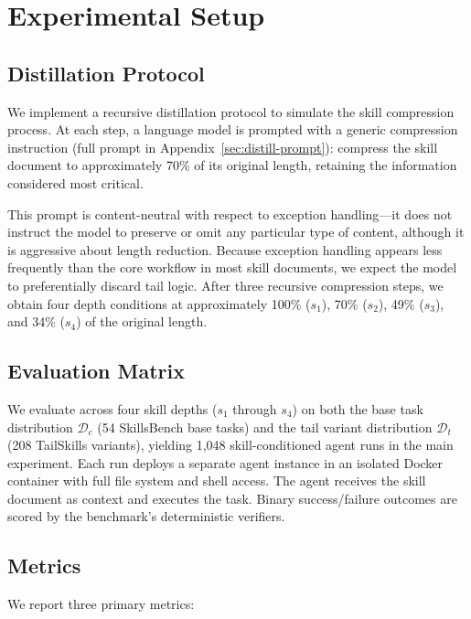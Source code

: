 \documentclass[11pt]{article}
\begin{document}
\section{Experimental Setup}

\subsection{Distillation Protocol}

We implement a recursive distillation protocol to simulate the skill compression process. At each step, a language model is prompted with a generic compression instruction (full prompt in Appendix~\ref{sec:distill-prompt}): compress the skill document to approximately 70\% of its original length, retaining the information considered most critical.

This prompt is content-neutral with respect to exception handling---it does not instruct the model to preserve or omit any particular type of content, although it is aggressive about length reduction. Because exception handling appears less frequently than the core workflow in most skill documents, we expect the model to preferentially discard tail logic. After three recursive compression steps, we obtain four depth conditions at approximately 100\% ($s_1$), 70\% ($s_2$), 49\% ($s_3$), and 34\% ($s_4$) of the original length.

\subsection{Evaluation Matrix}

We evaluate across four skill depths ($s_1$ through $s_4$) on both the base task distribution $\mathcal{D}_c$ (54 SkillsBench base tasks) and the tail variant distribution $\mathcal{D}_t$ (208 TailSkills variants), yielding 1,048 skill-conditioned agent runs in the main experiment. Each run deploys a separate agent instance in an isolated Docker container with full file system and shell access. The agent receives the skill document as context and executes the task. Binary success/failure outcomes are scored by the benchmark's deterministic verifiers.

\subsection{Metrics}

We report three primary metrics:
\end{document}
